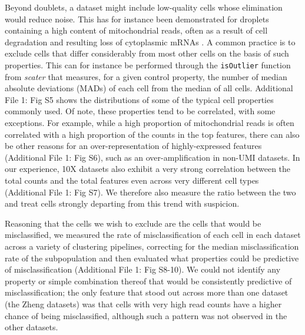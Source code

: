 \documentclass{bmcart}
\begin{document}
Beyond doublets, a dataset might include low-quality cells whose elimination would reduce noise. This has for instance been demonstrated for droplets containing a high content of mitochondrial reads, often as a result of cell degradation and resulting loss of cytoplasmic mRNAs \cite{IlicicLowQual2016}. A common practice is to exclude cells that differ considerably from most other cells on the basis of such properties. This can for instance be performed through the \texttt{isOutlier} function from \textit{scater} that measures, for a given control property, the number of median absolute deviations (MADs) of each cell from the median of all cells. Additional File 1: Fig S5 shows the distributions of some of the typical cell properties commonly used. Of note, these properties tend to be correlated, with some exceptions. For example, while a high proportion of mitochondrial reads is often correlated with a high proportion of the counts in the top features, there can also be other reasons for an over-representation of highly-expressed features (Additional File 1: Fig S6), such as an over-amplification in non-UMI datasets. In our experience, 10X datasets also exhibit a very strong correlation between the total counts and the total features even across very different cell types (Additional File 1: Fig S7). We therefore also measure the ratio between the two and treat cells strongly departing from this trend with suspicion.

Reasoning that the cells we wish to exclude are the cells that would be misclassified, we measured the rate of misclassification of each cell in each dataset across a variety of clustering pipelines, correcting for the median misclassification rate of the subpopulation and then evaluated what properties could be predictive of misclassification (Additional File 1: Fig S8-10). We could not identify any property or simple combination thereof that would be consistently predictive of misclassification; the only feature that stood out across more than one dataset (the Zheng datasets) was that cells with very high read counts have a higher chance of being misclassified, although such a pattern was not observed in the other datasets.
\end{document}

